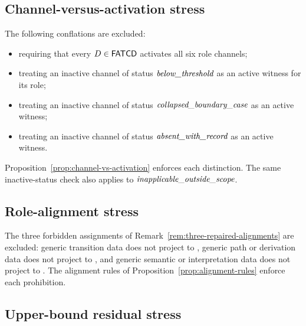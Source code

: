 \subsection{Channel-versus-activation stress}\label{subsec:channel-activation-stress}

\begin{remark}\label{prop:channel-activation-stress}
The following conflations are excluded:
\begin{itemize}[topsep=2pt,itemsep=1pt]
  \item requiring that every \(D \in \mathsf{FATCD}{}\) activates all six role
    channels;
  \item treating an inactive channel of status \(\textit{below\_\allowbreak threshold}\) as an
    active witness for its role;
  \item treating an inactive channel of status \(\textit{collapsed\_\allowbreak boundary\_\allowbreak case}\) as an
    active witness;
  \item treating an inactive channel of status \(\textit{absent\_\allowbreak with\_\allowbreak record}\) as an
    active witness.
\end{itemize}
Proposition~\ref{prop:channel-vs-activation} enforces each distinction.
The same inactive-status check also applies to
\(\textit{inapplicable\_\allowbreak outside\_\allowbreak scope}\).
\end{remark}

\subsection{Role-alignment stress}\label{subsec:role-alignment-stress}

\begin{remark}\label{prop:role-alignment-stress}
The three forbidden assignments of
Remark~\ref{rem:three-repaired-alignments} are excluded: generic
transition data does not project to \Pthree{}, generic path or
derivation data does not project to \Pfive{}, and generic semantic or
interpretation data does not project to \Pone{}. The alignment rules
of Proposition~\ref{prop:alignment-rules} enforce each prohibition.
\end{remark}

\subsection{Upper-bound residual stress}\label{subsec:upper-bound-residual-stress}

